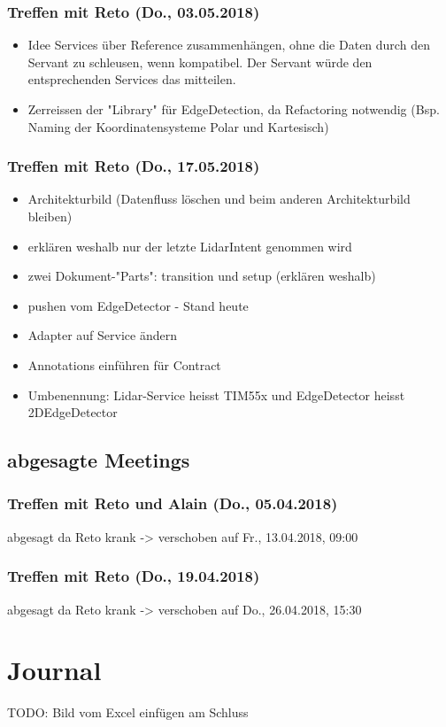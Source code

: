 \subsubsection{Treffen mit Reto (Do., 03.05.2018)}
\begin{itemize}
	\item Idee Services über Reference zusammenhängen, ohne die Daten durch den Servant zu schleusen, wenn kompatibel. Der Servant würde den entsprechenden Services das mitteilen.
	\item Zerreissen der "Library" für EdgeDetection, da Refactoring notwendig (Bsp. Naming der Koordinatensysteme Polar und Kartesisch)
\end{itemize}

\subsubsection{Treffen mit Reto (Do., 17.05.2018)}
\begin{itemize}
	\item Architekturbild (Datenfluss löschen und beim anderen Architekturbild bleiben)
	\item erklären weshalb nur der letzte LidarIntent genommen wird
	\item zwei Dokument-"Parts": transition und setup (erklären weshalb)
	\item pushen vom EdgeDetector - Stand heute
	\item Adapter auf Service ändern
	\item Annotations einführen für Contract
	\item Umbenennung: Lidar-Service heisst TIM55x und EdgeDetector heisst 2DEdgeDetector
\end{itemize}



\subsection{abgesagte Meetings}
\subsubsection{Treffen mit Reto und Alain (Do., 05.04.2018)}
abgesagt da Reto krank -> verschoben auf Fr., 13.04.2018, 09:00

\subsubsection{Treffen mit Reto (Do., 19.04.2018)}
abgesagt da Reto krank -> verschoben auf Do., 26.04.2018, 15:30

\section{Journal}
TODO: Bild vom Excel einfügen am Schluss